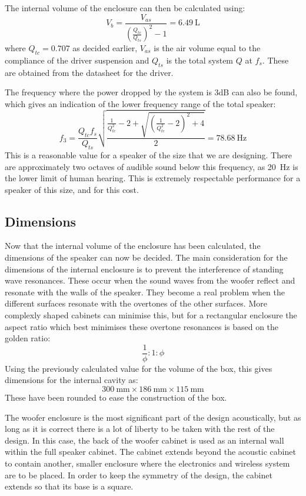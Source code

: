 \documentclass[main.tex]{subfiles}
\begin{document}
The internal volume of the enclosure can then be calculated using:
\begin{equation}
    V_b = \frac{V_{as}}{\left(\frac{Q_{tc}}{Q_{ts}}\right)^2-1}=\SI{6.49}{\liter}
\end{equation}
where $Q_{tc}=0.707$ as decided earlier, $V_{as}$ is the air volume equal to the compliance of the driver suspension and $Q_{ts}$ is the total system $Q$ at $f_s$.
These are obtained from the datasheet for the driver.

The frequency where the power dropped by the system is 3dB can also be found, which gives an indication of the lower frequency range of the total speaker:
\begin{equation}
    f_3 = \frac{Q_{tc}f_s}{Q_{ts}}\sqrt{\frac{\frac{1}{Q_{tc}^2}-2+\sqrt{\left(\frac{1}{Q_{tc}^2}-2\right)^2+4}}{2}}=\SI{78.68}{\hertz}
\end{equation}
This is a reasonable value for a speaker of the size that we are designing.
There are approximately two octaves of audible sound below this frequency, as \SI{20}{\hertz} is the lower limit of human hearing.
This is extremely respectable performance for a speaker of this size, and for this cost.
\subsection{Dimensions}
Now that the internal volume of the enclosure has been calculated, the dimensions of the speaker can now be decided.
The main consideration for the dimensions of the internal enclosure is to prevent the interference of standing wave resonances.
These occur when the sound waves from the woofer reflect and resonate with the walls of the speaker.
They become a real problem when the different surfaces resonate with the overtones of the other surfaces.
More complexly shaped cabinets can minimise this, but for a rectangular enclosure the aspect ratio which best minimises these overtone resonances is based on the golden ratio:
\begin{equation}
    \frac{1}{\phi}:1:\phi
\end{equation}
Using the previously calculated value for the volume of the box, this gives dimensions for the internal cavity as:
\begin{equation}
    \SI{300}{\milli\meter}\times\SI{186}{\milli\meter}\times\SI{115}{\milli\meter}
\end{equation}
These have been rounded to ease the construction of the box.

The woofer enclosure is the most significant part of the design acoustically, but as long as it is correct there is a lot of liberty to be taken with the rest of the design.
In this case, the back of the woofer cabinet is used as an internal wall within the full speaker cabinet.
The cabinet extends beyond the acoustic cabinet to contain another, smaller enclosure where the electronics and wireless system are to be placed.
In order to keep the symmetry of the design, the cabinet extends so that its base is a square.
\end{document}
